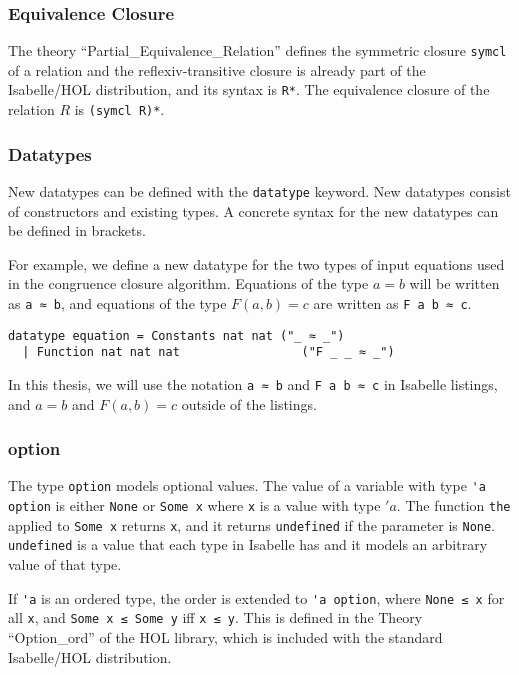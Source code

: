 \subsubsection{Equivalence Closure}

The theory ``Partial\_Equivalence\_Relation'' \cite{Collections-AFP} defines the symmetric closure \lstinline{symcl} of a relation and the reflexiv-transitive closure is already part of the Isabelle/HOL distribution, and its syntax is \lstinline{R*}.
The equivalence closure of the relation $R$ is \lstinline{(symcl R)*}.

\subsubsection{Datatypes}
\label{subsubsection:datatypes}

New datatypes can be defined with the \lstinline|datatype| keyword. New datatypes consist of constructors and existing types. A concrete syntax for the new datatypes can be defined in brackets.

For example, we define a new datatype for the two types of input equations used in the congruence closure algorithm. Equations of the type $a = b$ will be written as \lstinline{a ≈ b}, and equations of the type $F(a, b) = c$ are written as \lstinline{F a b ≈ c}.

\begin{lstlisting}
datatype equation = Constants nat nat ("_ ≈ _")
  | Function nat nat nat                 ("F _ _ ≈ _")
\end{lstlisting}

In this thesis, we will use the notation \lstinline{a ≈ b} and \lstinline{F a b ≈ c} in Isabelle listings, and
$a = b$ and $F(a, b) = c$ outside of the listings.

\subsubsection{option}

The type \lstinline{option} models optional values. The value of a variable with type \lstinline{'a option} is either \lstinline|None| or \lstinline|Some x| where \lstinline|x| is a value with type $'a$. The function \lstinline|the| applied to \lstinline|Some x| returns \lstinline|x|, and it returns \lstinline|undefined| if the parameter is \lstinline|None|. \lstinline|undefined| is a value that each type in Isabelle has and it models an arbitrary value of that type.

If \lstinline{'a} is an ordered type, the order is extended to \lstinline{'a option}, where \lstinline{None ≤ x} for all \lstinline|x|, and \lstinline{Some x ≤ Some y} iff \lstinline{x ≤ y}. This is defined in the Theory ``Option\_ord'' of the HOL library, which is included with the standard Isabelle/HOL distribution.

